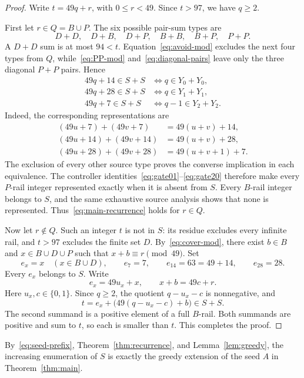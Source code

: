 \documentclass[11pt,letterpaper]{article}
\begin{document}
\begin{proof}
Write \(t=49q+r\), with \(0\leq r<49\). Since \(t>97\), we have $q\geq2$.

First let \(r\in Q=B\cup P\). The six possible pair-sum types are
\[
D+D,\quad D+B,\quad D+P,\quad B+B,\quad B+P,\quad P+P.
\]
A \(D+D\) sum is at most \(94<t\). Equation~\eqref{eq:avoid-mod} excludes the next four types from \(Q\), while~\eqref{eq:PP-mod} and~\eqref{eq:diagonal-pairs} leave only the three diagonal \(P+P\) pairs. Hence
\begin{align*}
49q+14\in S+S&\iff q\in Y_0+Y_0,\\
49q+28\in S+S&\iff q\in Y_1+Y_1,\\
49q+7\in S+S&\iff q-1\in Y_2+Y_2.
\end{align*}
Indeed, the corresponding representations are
\begin{align*}
(49u+7)+(49v+7)&=49(u+v)+14,\\
(49u+14)+(49v+14)&=49(u+v)+28,\\
(49u+28)+(49v+28)&=49(u+v+1)+7.
\end{align*}
The exclusion of every other source type proves the converse implication in each equivalence. The controller identities~\eqref{eq:gate01}--\eqref{eq:gate20} therefore make every \(P\)-rail integer represented exactly when it is absent from \(S\). Every \(B\)-rail integer belongs to \(S\), and the same exhaustive source analysis shows that none is represented. Thus~\eqref{eq:main-recurrence} holds for \(r\in Q\).

Now let \(r\notin Q\). Such an integer \(t\) is not in \(S\): its residue excludes every infinite rail, and \(t>97\) excludes the finite set \(D\). By~\eqref{eq:cover-mod}, there exist \(b\in B\) and \(x\in B\cup D\cup P\) such that \(x+b\equiv r\pmod {49}\). Set
\[
e_x=x\quad(x\in B\cup D),
\qquad e_7=7,\qquad e_{14}=63=49+14,\qquad e_{28}=28.
\]
Every \(e_x\) belongs to \(S\). Write
\[
e_x=49u_x+x,
\qquad x+b=49c+r.
\]
Here \(u_x,c\in\{0,1\}\). Since \(q\geq2\), the quotient \(q-u_x-c\) is nonnegative, and
\[
t=e_x+\bigl(49(q-u_x-c)+b\bigr)\in S+S.
\]
The second summand is a positive element of a full \(B\)-rail. Both summands are positive and sum to \(t\), so each is smaller than \(t\). This completes the proof.
\end{proof}

By~\eqref{eq:seed-prefix}, Theorem~\ref{thm:recurrence}, and Lemma~\ref{lem:greedy}, the increasing enumeration of \(S\) is exactly the greedy extension of the seed $A$ in Theorem~\ref{thm:main}.
\end{document}

